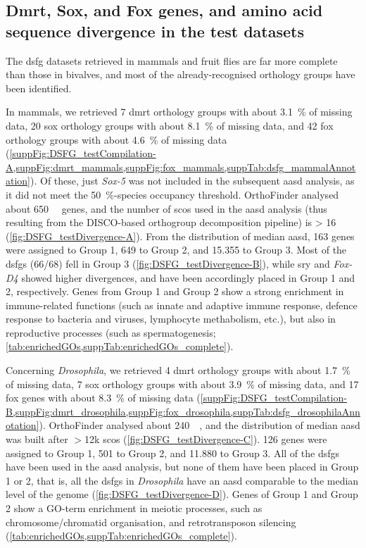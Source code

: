 \subsection{Dmrt, Sox, and Fox genes, and amino acid sequence divergence in the test datasets} \label{subSect:dsfgTestDataset}
The \gls{dsfg} datasets retrieved in mammals and fruit flies are far more complete than those in bivalves, and most of the already-recognised orthology groups have been identified.

In mammals, we retrieved 7 \gls{dmrt} orthology groups with about \qty{3.1}{\percent} of missing data, 20 \gls{sox} orthology groups with about \qty{8.1}{\percent} of missing data, and 42 \gls{fox} orthology groups with about \qty{4.6}{\percent} of missing data (\cref{suppFig:DSFG_testCompilation-A,suppFig:dmrt_mammals,suppFig:fox_mammals,suppTab:dsfg_mammalAnnotation}). Of these, just \textit{Sox-5} was not included in the subsequent \gls{aasd} analysis, as it did not meet the \qty{50}{\percent}-species occupancy threshold. OrthoFinder analysed about \qty{650}{\mega\nothing} genes, and the number of \glspl{sco} used in the \gls{aasd} analysis (thus resulting from the DISCO-based orthogroup decomposition pipeline) is \qty{> 16}{\kilo\nothing} (\cref{fig:DSFG_testDivergence-A}). From the distribution of median \gls{aasd}, 163 genes were assigned to Group 1, 649 to Group 2, and 15.355 to Group 3. Most of the \glspl{dsfg} (66/68) fell in Group 3 (\cref{fig:DSFG_testDivergence-B}), while \gls{sry} and \textit{Fox-D4} showed higher divergences, and have been accordingly placed in Group 1 and 2, respectively. Genes from Group 1 and Group 2 show a strong enrichment in immune-related functions (such as innate and adaptive immune response, defence response to bacteria and viruses, lymphocyte methabolism, etc.), but also in reproductive processes (such as spermatogenesis; \cref{tab:enrichedGOs,suppTab:enrichedGOs_complete}).

Concerning \textit{Drosophila}, we retrieved 4 \gls{dmrt} orthology groups with about \qty{1.7}{\percent} of missing data, 7 \gls{sox} orthology groups with about \qty{3.9}{\percent} of missing data, and 17 \gls{fox} genes with about \qty{8.3}{\percent} of missing data (\cref{suppFig:DSFG_testCompilation-B,suppFig:dmrt_drosophila,suppFig:fox_drosophila,suppTab:dsfg_drosophilaAnnotation}). OrthoFinder analysed about \qty{240}{\mega\nothing}, and the distribution of median \gls{aasd} was built after $>$12k \glspl{sco} (\cref{fig:DSFG_testDivergence-C}). 126 genes were assigned to Group 1, 501 to Group 2, and 11.880 to Group 3. All of the \glspl{dsfg} have been used in the \gls{aasd} analysis, but none of them have been placed in Group 1 or 2, that is, all the \glspl{dsfg} in \textit{Drosophila} have an \gls{aasd} comparable to the median level of the genome (\cref{fig:DSFG_testDivergence-D}). Genes of Group 1 and Group 2 show a GO-term enrichment in meiotic processes, such as chromosome/chromatid organisation, and retrotransposon silencing (\cref{tab:enrichedGOs,suppTab:enrichedGOs_complete}).

